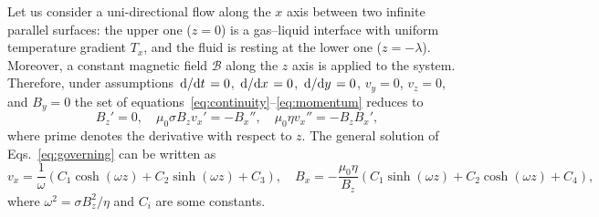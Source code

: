 \documentclass{article}
\begin{document}
Let us consider a uni-directional flow along the $x$ axis between two infinite parallel surfaces:
the upper one ($z=0$) is a gas--liquid interface with uniform temperature gradient $T_x$,
and the fluid is resting at the lower one ($z=-\lambda$).
Moreover, a constant magnetic field $\mathcal{B}$ along the $z$ axis is applied to the system.
Therefore, under assumptions $\dv*{t}=0$, $\dv*{x}=0$, $\dv*{y}=0$, $v_y=0$, $v_z=0$,
and $B_y=0$ the set of equations~\eqref{eq:continuity}--\eqref{eq:momentum} reduces to
\begin{equation}\label{eq:governing}
    B_z' = 0, \quad \mu_0\sigma B_z v_x' = -B_x'', \quad \mu_0\eta v_x'' = -B_z B_x',
\end{equation}
where prime denotes the derivative with respect to $z$.
The general solution of Eqs.~\eqref{eq:governing} can be written as
\begin{equation}\label{eq:general_solution}
    v_x = \frac1\omega(C_1\cosh(\omega z) + C_2\sinh(\omega z) + C_3), \quad
    B_x = -\frac{\mu_0\eta}{B_z}(C_1\sinh(\omega z) + C_2\cosh(\omega z) + C_4),
\end{equation}
where $\omega^2 = \sigma B_z^2/\eta$ and $C_i$ are some constants.
\end{document}
